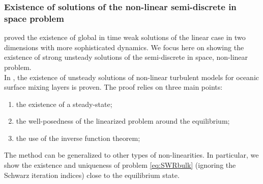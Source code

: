 \subsubsection{Existence of solutions of the
non-linear semi-discrete in space problem}
\cite{lions_mathematical_1995} proved the existence
of global in time weak solutions of the linear case in
two dimensions with more sophisticated dynamics.
We focus here on showing the existence of strong
unsteady solutions of the semi-discrete in space,
non-linear problem.
\\
In \citep{chacon-rebollo_existence_2014},
the existence of unsteady solutions of
non-linear turbulent models for oceanic surface mixing layers is
proven.
The proof relies on three main points:
\begin{enumerate}
	\item the existence of a steady-state;
	\item the well-posedness of the linearized problem
	around the equilibrium;
	\item the use of the inverse function theorem;
\end{enumerate}
The method can be generalized to other types of
non-linearities. In particular, we show the existence and
uniqueness of problem \eqref{eq:SWRbulk}
(ignoring the Schwarz iteration indices) close to the
equilibrium state.
